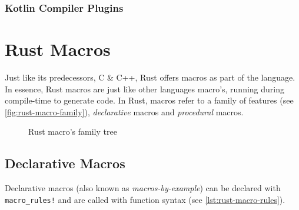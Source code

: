 \subsubsection*{Kotlin Compiler Plugins}\label{sec:lang-preprocessors:kotlin:annotation}


\section{Rust Macros}\label{sec:rust-macros}

Just like its predecessors, C \& C++, Rust offers macros as part of the language.
In essence, Rust macros are just like other languages macro's, running during compile-time to generate code.
In Rust, macros refer to a family of features (see \autoref{fig:rust-macro-family}),
\emph{declarative} macros and \emph{procedural} macros.

\begin{figure}
    \centering
    \caption{Rust macro's family tree}
    \label{fig:rust-macro-family}
\end{figure}

\subsection{Declarative Macros}

Declarative macros (also known as \emph{macros-by-example}) can be declared with \texttt{macro\_rules!}
and are called with function syntax (see \autoref{lst:rust-macro-rules}).

